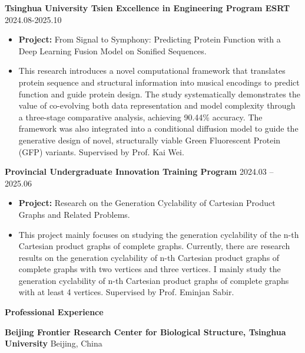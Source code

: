 \documentclass[11pt]{article}
\begin{document}
	\vspace{10pt}
	
	\textbf{Tsinghua University Tsien Excellence in Engineering Program ESRT} \hfill 2024.08-2025.10
	\begin{itemize}[noitemsep, topsep=0pt, partopsep=0pt, parsep=0pt, leftmargin=*]
		\item \textbf{Project:} From Signal to Symphony: Predicting Protein Function with a Deep Learning Fusion Model on Sonified Sequences.
		\item This research introduces a novel computational framework that translates protein sequence and structural information into musical encodings to predict function and guide protein design. The study systematically demonstrates the value of co-evolving both data representation and model complexity through a three-stage comparative analysis, achieving 90.44\% accuracy. The framework was also integrated into a conditional diffusion model to guide the generative design of novel, structurally viable Green Fluorescent Protein (GFP) variants. Supervised by Prof. Kai Wei.
	\end{itemize}
	
	\vspace{10pt}
	
	\textbf{Provincial Undergraduate Innovation Training Program} \hfill 2024.03 – 2025.06
	\begin{itemize}[noitemsep, topsep=0pt, partopsep=0pt, parsep=0pt, leftmargin=*]
		\item \textbf{Project:} Research on the Generation Cyclability of Cartesian Product Graphs and Related Problems.
		\item This project mainly focuses on studying the generation cyclability of the n-th Cartesian product graphs of complete graphs. Currently, there are research results on the generation cyclability of n-th Cartesian product graphs of complete graphs with two vertices and three vertices. I mainly study the generation cyclability of n-th Cartesian product graphs of complete graphs with at least 4 vertices. Supervised by Prof. Eminjan Sabir.
	\end{itemize}
	
	\vspace{12pt}
	
	\clearpage
	\begin{center}
		\textbf{\large Professional Experience}
	\end{center}
	\textbf{Beijing Frontier Research Center for Biological Structure, Tsinghua University} \hfill Beijing, China
	
\end{document}

